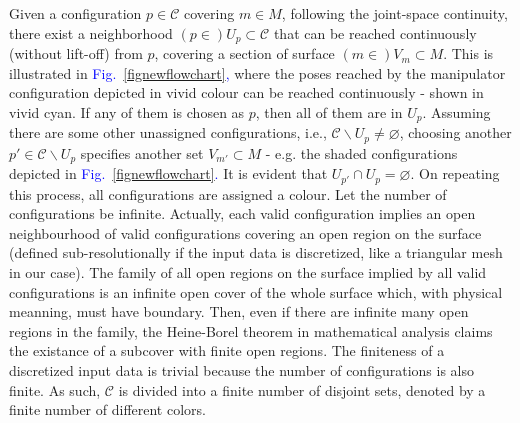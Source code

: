 \documentclass[journal]{IEEEtran}
\begin{document}
Given a configuration $p \in \mathscr{C}$ covering $m\in M$, following the joint-space continuity, there exist a neighborhood $(p\in)U_p\subset \mathscr{C}$ that can be reached continuously (without lift-off) from $p$, covering a section of surface 
$(m\in )V_{m}\subset M$. This is illustrated in 
\textcolor{blue}{Fig.~\ref{fignewflowchart}, }
where the poses reached by the manipulator 
configuration depicted in vivid colour can be reached continuously - shown in vivid cyan. 
If any of them is chosen as $p$, then all of them are in $U_p$. 
Assuming there are some other unassigned configurations, i.e., $\mathscr{C}\backslash U_p\neq \varnothing$, 
choosing another  $p'\in \mathscr{C}\backslash U_p$ specifies another set $V_{m'}\subset M$ - e.g. the shaded 
configurations depicted in 
\textcolor{blue}{Fig.~\ref{fignewflowchart}. }
It is evident that $U_{p'} \cap U_{p} = \varnothing$. 
On repeating this process, all configurations are assigned a colour. 
Let the number of configurations be infinite. Actually, each valid configuration implies an open neighbourhood of valid configurations covering an open region on the surface (defined sub-resolutionally if the input data is discretized, like a triangular mesh in our case). The family of all open regions on the surface implied by all valid configurations is an infinite open cover of the whole surface which, with physical meanning, must have boundary. Then, even if there are infinite many open regions in the family, the Heine-Borel theorem in mathematical analysis claims the existance of a subcover with finite open regions. The finiteness of a discretized input data is trivial because the number of configurations is also finite.
As such, $\mathscr{C}$ is divided into a finite number of disjoint sets, denoted by a finite number of different colors. 
\end{document}
